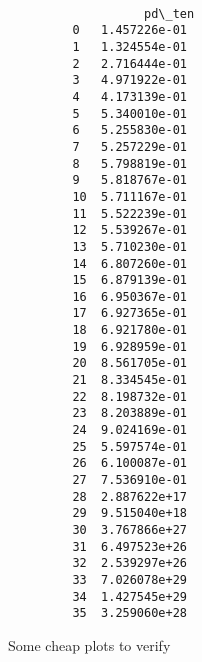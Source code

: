 \documentclass{article}
\begin{document}
\begin{Verbatim}[commandchars=\\\{\}]
                           
                   pd\_ten  
         0   1.457226e-01  
         1   1.324554e-01  
         2   2.716444e-01  
         3   4.971922e-01  
         4   4.173139e-01  
         5   5.340010e-01  
         6   5.255830e-01  
         7   5.257229e-01  
         8   5.798819e-01  
         9   5.818767e-01  
         10  5.711167e-01  
         11  5.522239e-01  
         12  5.539267e-01  
         13  5.710230e-01  
         14  6.807260e-01  
         15  6.879139e-01  
         16  6.950367e-01  
         17  6.927365e-01  
         18  6.921780e-01  
         19  6.928959e-01  
         20  8.561705e-01  
         21  8.334545e-01  
         22  8.198732e-01  
         23  8.203889e-01  
         24  9.024169e-01  
         25  5.597574e-01  
         26  6.100087e-01  
         27  7.536910e-01  
         28  2.887622e+17  
         29  9.515040e+18  
         30  3.767866e+27  
         31  6.497523e+26  
         32  2.539297e+26  
         33  7.026078e+29  
         34  1.427545e+29  
         35  3.259060e+28  
\end{Verbatim}
        
    Some cheap plots to verify
\end{document}

